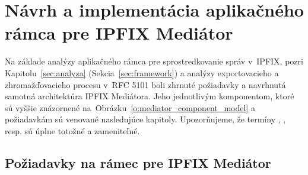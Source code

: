 \section{Návrh a implementácia aplikačného rámca pre IPFIX Mediátor} \label{sec:navrh}

Na základe analýzy aplikačného rámca pre sprostredkovanie správ v~IPFIX, pozri Kapitolu~\ref{sec:analyza} 
(Sekcia~\ref{sec:framework}) a analýzy exportovacieho a zhromažďovacieho procesu v~RFC 5101
\citep{rfc5101} boli zhrnuté požiadavky a navrhnutá samotná architektúra IPFIX Mediátora. 
Jeho jednotlivým komponentom, ktoré sú vyššie znázornené na~Obrázku~\ref{o:mediator_component_model} 
a požiadavkám sú venované nasledujúce kapitoly. Upozorňujeme, že termíny , 
, resp.  sú úplne totožné a zameniteľné.


\subsection{Požiadavky na rámec pre IPFIX Mediátor}

